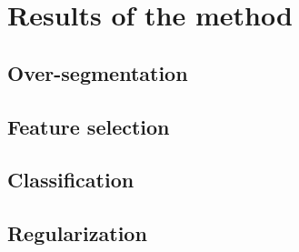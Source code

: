 \section{Results of the method}
\subsection{Over-segmentation}
\subsection{Feature selection}
\subsection{Classification}
\subsection{Regularization}




\stopcontents[chapters]